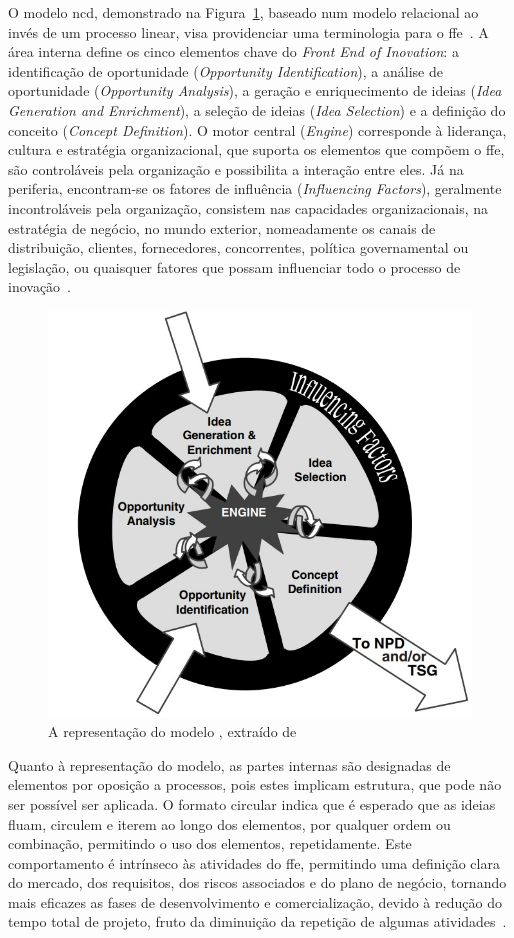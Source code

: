 O modelo \gls{ncd}, demonstrado na Figura~\ref{fig:ncd_model}, baseado num modelo relacional ao invés de um processo linear, visa providenciar uma terminologia para o \gls{ffe}~\parencite{ffe_effectivemethods_tools_techniques}. A área interna define os cinco elementos chave do \textit{Front End of Inovation}: a identificação de oportunidade (\textit{Opportunity Identification}), a análise de oportunidade (\textit{Opportunity Analysis}), a geração e enriquecimento de ideias (\textit{Idea Generation and Enrichment}), a seleção de ideias (\textit{Idea Selection}) e a definição do conceito (\textit{Concept Definition}). O motor central (\textit{Engine}) corresponde à liderança, cultura e estratégia organizacional, que suporta os elementos que compõem o \gls{ffe}, são controláveis pela organização e possibilita a interação entre eles. Já na periferia, encontram-se os fatores de influência (\textit{Influencing Factors}), geralmente incontroláveis pela organização, consistem nas capacidades organizacionais, na estratégia de negócio, no mundo exterior, nomeadamente os canais de distribuição, clientes, fornecedores, concorrentes, política governamental ou legislação, ou quaisquer fatores que possam influenciar todo o processo de inovação~\parencite{ffe_effectivemethods_tools_techniques, providing_clarity_common_language_ffe}.

\begin{figure}[!ht]
    \centering
    \includegraphics[width=.55\textwidth]{ch02/assets/ncd_model.jpg}
    \caption{A representação do modelo , extraído de~\textcite{ffe_effectivemethods_tools_techniques}}
    \label{fig:ncd_model}
\end{figure}

Quanto à representação do modelo, as partes internas são designadas de elementos por oposição a processos, pois estes implicam estrutura, que pode não ser possível ser aplicada. O formato circular indica que é esperado que as ideias fluam, circulem e iterem ao longo dos elementos, por qualquer ordem ou combinação, permitindo o uso dos elementos, repetidamente. Este comportamento é intrínseco às atividades do \gls{ffe}, permitindo uma definição clara do mercado, dos requisitos, dos riscos associados e do plano de negócio, tornando mais eficazes as fases de desenvolvimento e comercialização, devido à redução do tempo total de projeto, fruto da diminuição da repetição de algumas atividades~\parencite{ffe_effectivemethods_tools_techniques}. 


